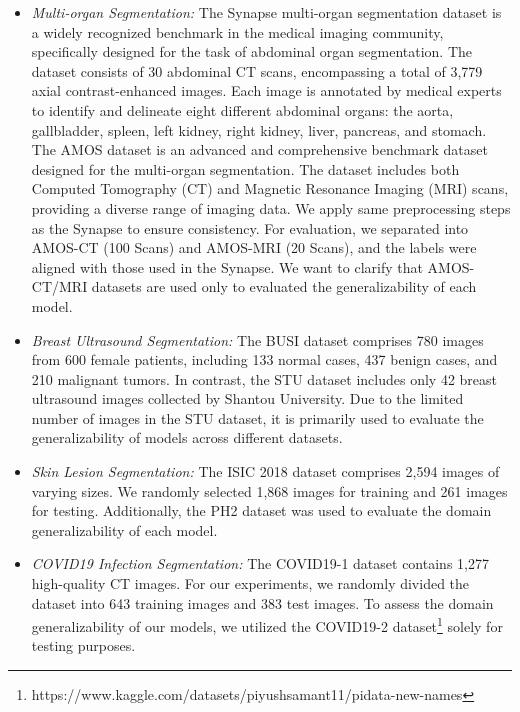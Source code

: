 \begin{itemize}
    \item \textit{Multi-organ Segmentation:} The Synapse multi-organ segmentation dataset \cite{Synapse_dataset} is a widely recognized benchmark in the medical imaging community, specifically designed for the task of abdominal organ segmentation. The dataset consists of 30 abdominal CT scans, encompassing a total of 3,779 axial contrast-enhanced images. Each image is annotated by medical experts to identify and delineate eight different abdominal organs: the aorta, gallbladder, spleen, left kidney, right kidney, liver, pancreas, and stomach. The AMOS dataset \cite{ji2022amos} is an advanced and comprehensive benchmark dataset designed for the multi-organ segmentation. The dataset includes both Computed Tomography (CT) and Magnetic Resonance Imaging (MRI) scans, providing a diverse range of imaging data. We apply same preprocessing steps as the Synapse to ensure consistency. For evaluation, we separated into AMOS-CT (100 Scans) and AMOS-MRI (20 Scans), and the labels were aligned with those used in the Synapse. We want to clarify that AMOS-CT/MRI datasets are used only to evaluated the generalizability of each model. \\
    
    \item \textit{Breast Ultrasound Segmentation:} The BUSI dataset \cite{al2020dataset} comprises 780 images from 600 female patients, including 133 normal cases, 437 benign cases, and 210 malignant tumors. In contrast, the STU dataset \cite{zhuang2019rdau} includes only 42 breast ultrasound images collected by Shantou University. Due to the limited number of images in the STU dataset, it is primarily used to evaluate the generalizability of models across different datasets. \\

    \item \textit{Skin Lesion Segmentation:} The ISIC 2018 dataset \cite{gutman2016skin} comprises 2,594 images of varying sizes. We randomly selected 1,868 images for training and 261 images for testing. Additionally, the PH2 dataset \cite{mendoncca2013ph} was used to evaluate the domain generalizability of each model. \\

    
    \item \textit{COVID19 Infection Segmentation:} The COVID19-1 dataset \cite{ma_jun_2020_3757476} contains 1,277 high-quality CT images. For our experiments, we randomly divided the dataset into 643 training images and 383 test images. To assess the domain generalizability of our models, we utilized the COVID19-2 dataset\footnote{https://www.kaggle.com/datasets/piyushsamant11/pidata-new-names} solely for testing purposes. \\
     

\end{itemize}
